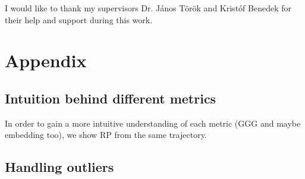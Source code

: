 \documentclass[a4paper,12pt]{article}
\begin{document}
I would like to thank my supervisors Dr. János Török and Kristóf Benedek for their help and support during this work.

\newpage



\section{Appendix }

\subsection{Intuition behind different metrics}

In order to gain a more intuitive understanding of each metric (GGG and maybe embedding too), we show RP from the same trajectory.



\subsection{Handling outliers}
\end{document}
